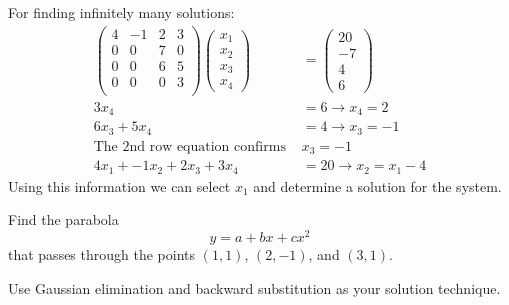\documentclass[12pt, answers]{exam}
\begin{document}
\begin{questions}
\begin{solution}
\begin{parts}
For finding infinitely many solutions:
%
\renewcommand{\caa}{4}
\renewcommand{\cab}{-1}
\renewcommand{\cac}{2}
\renewcommand{\cad}{3}
\renewcommand{\cba}{0}
\renewcommand{\cbb}{0}
\renewcommand{\cbc}{7}
\renewcommand{\cbd}{0}
\renewcommand{\cca}{0}
\renewcommand{\ccb}{0}
\renewcommand{\ccc}{6}
\renewcommand{\ccd}{5}
\renewcommand{\cda}{0}
\renewcommand{\cdb}{0}
\renewcommand{\cdc}{0}
\renewcommand{\cdd}{3}
\newcommand{\ba}{20}
\newcommand{\bb}{-7}
\newcommand{\bc}{4}
\newcommand{\bd}{6}
%
\begin{align}
\begin{pmatrix}
  \caa & \cab & \cac & \cad \\
  \cba & \cbb & \cbc & \cbd \\
  \cca & \ccb & \ccc & \ccd \\
  \cda & \cdb & \cdc & \cdd \\
\end{pmatrix} 
\begin{pmatrix} x_1 \\ x_2 \\ x_3 \\ x_4 \end{pmatrix} &= 
\begin{pmatrix} \ba \\ \bb  \\ \bc \\ \bd \end{pmatrix} \nonumber \\
%
\cdd x_4 &= \bd \rightarrow \boxed{x_4 = 2} \nonumber \\
%
\ccc x_3 + \ccd x_4 &= \bc \rightarrow \boxed{x_3 = -1} \nonumber \\
%
\text{The 2nd row equation confirms } &x_3 = -1 \nonumber \\
%
\caa x_1 + \cab x_2 + \cac x_3 + \cad x_4 &= \ba \rightarrow \boxed{x_2 = x_1 - 4} \nonumber
\end{align}
%
Using this information we can select $x_1$ and determine a solution for the system. 
\end{parts}
\end{solution}


\vspace*{3em}
\addpoints
\question[10] Find the parabola
\[ y = a + bx + cx^2\]
that passes through the points $(1,1)$, $(2,-1)$, and $(3,1)$. 

Use Gaussian elimination and backward substitution as your solution technique.



\end{questions}
\end{document}
